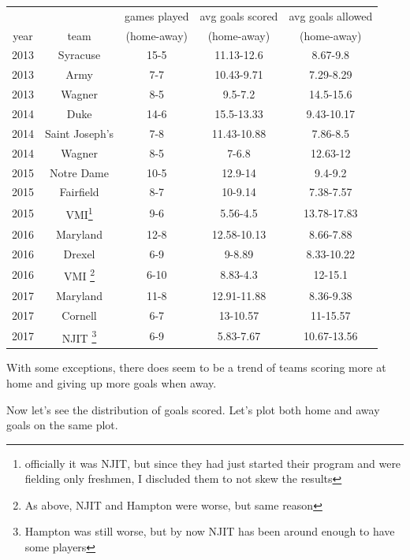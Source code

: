 \documentclass[11pt,a4paper]{article}
\begin{document}
\begin{tabular}{| c || c | c | c | c |}
	\hline
	 & & games played & avg goals scored & avg goals allowed \\ 
	year & team & (home-away) & (home-away) & (home-away) \\\hline \hline
	2013 & Syracuse & 15-5 & 11.13-12.6 & 8.67-9.8 \\ \hline
	2013 & Army & 7-7 & 10.43-9.71 & 7.29-8.29 \\ \hline
	2013 & Wagner & 8-5 & 9.5-7.2 & 14.5-15.6 \\ \hline \hline
	2014 & Duke & 14-6 & 15.5-13.33 & 9.43-10.17 \\ \hline
	2014 & Saint Joseph's & 7-8 & 11.43-10.88 & 7.86-8.5 \\ \hline
	2014 & Wagner & 8-5 & 7-6.8 & 12.63-12 \\ \hline \hline
	2015 & Notre Dame & 10-5 & 12.9-14 & 9.4-9.2 \\ \hline
	2015 & Fairfield & 8-7 & 10-9.14 & 7.38-7.57 \\ \hline
	2015 & VMI\footnote{officially it was NJIT, but since they had just started their program and were fielding only freshmen, I discluded them to not skew the results} & 9-6 & 5.56-4.5 & 13.78-17.83 \\ \hline \hline
	2016 & Maryland & 12-8 & 12.58-10.13 & 8.66-7.88 \\ \hline
	2016 & Drexel & 6-9 & 9-8.89 & 8.33-10.22 \\ \hline
	2016 & VMI \footnote{As above, NJIT and Hampton were worse, but same reason} & 6-10 & 8.83-4.3 & 12-15.1 \\ \hline \hline
	2017 & Maryland & 11-8 & 12.91-11.88 & 8.36-9.38 \\ \hline
	2017 & Cornell & 6-7 & 13-10.57 & 11-15.57 \\ \hline
	2017 & NJIT \footnote{Hampton was still worse, but by now NJIT has been around enough to have some players} & 6-9 & 5.83-7.67 & 10.67-13.56 \\ \hline 
	\hline
\end{tabular}

\vspace{5mm}

With some exceptions, there does seem to be a trend of teams scoring more at home and giving up more goals when away. 

Now let's see the distribution of goals scored. Let's plot both home and away goals on the same plot.
\end{document}
